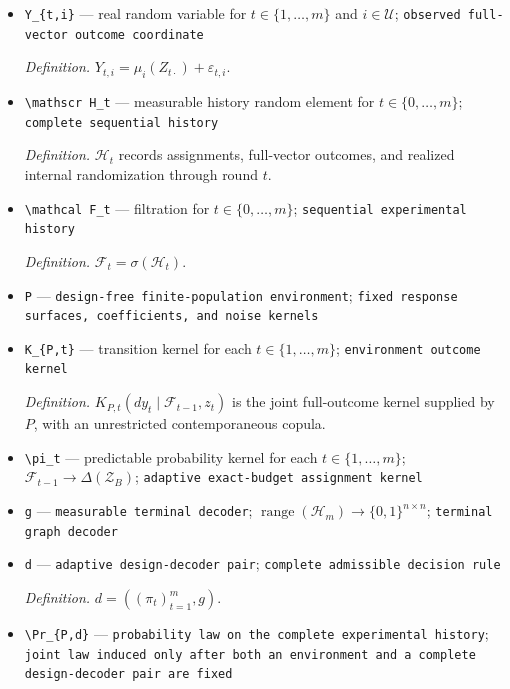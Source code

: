 \documentclass{article}
\begin{document}
\begin{itemize}
  \item \texttt{Y\_\allowbreak{}\{t,\allowbreak{}i\}\allowbreak{}} --- real random variable for \(t\in\{1,\ldots,m\}\) and \(i\in\mathcal U\); \texttt{observed full-\allowbreak{}vector outcome coordinate}
  \par\smallskip\noindent\emph{Definition.} \(Y_{t,i}=\mu_i(Z_{t\cdot})+\varepsilon_{t,i}\).
  \item \texttt{\textbackslash{}\allowbreak{}mathscr H\_\allowbreak{}t} --- measurable history random element for \(t\in\{0,\ldots,m\}\); \texttt{complete sequential history}
  \par\smallskip\noindent\emph{Definition.} \(\mathscr H_t\) records assignments, full-vector outcomes, and realized internal randomization through round \(t\).
  \item \texttt{\textbackslash{}\allowbreak{}mathcal F\_\allowbreak{}t} --- filtration for \(t\in\{0,\ldots,m\}\); \texttt{sequential experimental history}
  \par\smallskip\noindent\emph{Definition.} \(\mathcal F_t=\sigma(\mathscr H_t)\).
  \item \texttt{P} --- \texttt{design-\allowbreak{}free finite-\allowbreak{}population environment}; \texttt{fixed response surfaces,\allowbreak{} coefficients,\allowbreak{} and noise kernels}
  \item \texttt{K\_\allowbreak{}\{P,\allowbreak{}t\}\allowbreak{}} --- transition kernel for each \(t\in\{1,\ldots,m\}\); \texttt{environment outcome kernel}
  \par\smallskip\noindent\emph{Definition.} \(K_{P,t}(dy_t\mid\mathcal F_{t-1},z_t)\) is the joint full-outcome kernel supplied by \(P\), with an unrestricted contemporaneous copula.
  \item \texttt{\textbackslash{}\allowbreak{}pi\_\allowbreak{}t} --- predictable probability kernel for each \(t\in\{1,\ldots,m\}\); \(\mathcal F_{t-1}\to\Delta(\mathcal Z_B)\); \texttt{adaptive exact-\allowbreak{}budget assignment kernel}
  \item \texttt{g} --- \texttt{measurable terminal decoder}; \(\operatorname{range}(\mathscr H_m)\to\{0,1\}^{n\times n}\); \texttt{terminal graph decoder}
  \item \texttt{d} --- \texttt{adaptive design-\allowbreak{}decoder pair}; \texttt{complete admissible decision rule}
  \par\smallskip\noindent\emph{Definition.} \(d=((\pi_t)_{t=1}^m,g)\).
  \item \texttt{\textbackslash{}\allowbreak{}Pr\_\allowbreak{}\{P,\allowbreak{}d\}\allowbreak{}} --- \texttt{probability law on the complete experimental history}; \texttt{joint law induced only after both an environment and a complete design-\allowbreak{}decoder pair are fixed}

\end{itemize}
\end{document}

